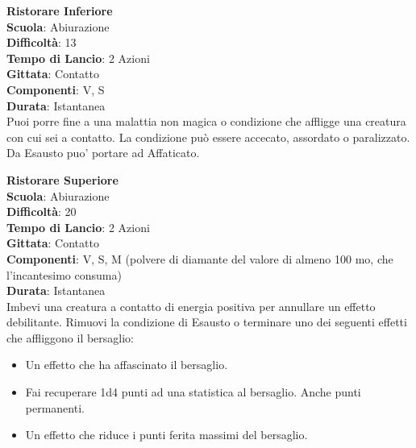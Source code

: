 \begin{multicols}{2}
\medskip\textbf{Ristorare Inferiore}\\
\textbf{Scuola}: Abiurazione\\
\textbf{Difficoltà}:  13\\
\textbf{Tempo di Lancio}: 2 Azioni\\
\textbf{Gittata}: Contatto\\
\textbf{Componenti}: V, S\\
\textbf{Durata}: Istantanea\\
Puoi porre fine a una malattia non magica o condizione che affligge una creatura con cui sei a contatto. La condizione può essere accecato, assordato o paralizzato. Da Esausto puo' portare ad Affaticato.

\medskip\textbf{Ristorare Superiore}\\
\textbf{Scuola}: Abiurazione\\
\textbf{Difficoltà}:  20\\
\textbf{Tempo di Lancio}: 2 Azioni\\
\textbf{Gittata}: Contatto\\
\textbf{Componenti}: V, S, M (polvere di diamante del valore di almeno 100 mo, che l'incantesimo consuma)\\
\textbf{Durata}: Istantanea\\
Imbevi una creatura a contatto di energia positiva per annullare un effetto debilitante. Rimuovi la condizione di Esausto o terminare uno dei seguenti effetti che affliggono il bersaglio: 
\medskip
\begin{itemize}
\item
Un effetto che ha affascinato il bersaglio.
\item
Fai recuperare 1d4 punti ad una statistica al bersaglio. Anche punti permanenti.
\item
Un effetto che riduce i punti ferita massimi del bersaglio.
\end{itemize}


\end{multicols}
